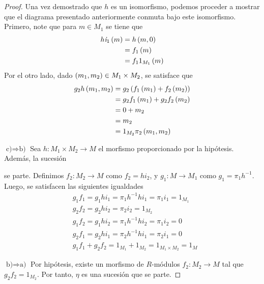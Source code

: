 \documentclass{article}
\begin{document}
\begin{enumerate}[label=\textbf{Ej \arabic*.}]
\begin{proof}
			Una vez demostrado que $h$ es un isomorfismo, podemos proceder a mostrar que el diagrama presentado anteriormente conmuta bajo este isomorfismo. Primero, note que para $m \in M_{1}$ se tiene que 
			\begin{align*}
				h\textit{i}_{1}\left(m\right)&=h\left(m,0\right)\\
				&=f_{1}\left(m\right)\\
				&=f_{1}1_{M_{1}}\left(m\right)
			\end{align*}
			Por el otro lado, dado $\left(m_{1},m_{2}\right) \in M_{1} \times M_{2}$, se satisface que
			\begin{align*}
				g_{2}h\left(m_{1},m_{2}\right)&=g_{2}\left(f_{1}\left(m_{1}\right)+f_{2}\left(m_{2}\right)\right)\\
				&=g_{2}f_{1}\left(m_{1}\right)+g_{2}f_{2}\left(m_{2}\right)\\
				&=0+m_{2}\\
				&=m_{2}\\
				&=1_{M_{2}}\pi_{2}\left(m_{1},m_{2}\right)
			\end{align*}
			
			$\boxed{\text{c)}\Rightarrow\text{b)}}$ Sea $h:M_{1} \times M_{2} \longrightarrow M$ el morfismo proporcionado por la hipótesis. Además, la sucesión
			se parte. Definimos $f_{2}:M_{2} \longrightarrow M$ como $f_{2}=hi_{2}$, y $g_{1}:M \longrightarrow M_{1}$ como $g_{1}=\pi_{1}h^{-1}$.\\
			
			Luego, se satisfacen las siguientes igualdades
			\begin{align*}
				& g_{1}f_{1}=g_{1}hi_{1}=\pi_{1}h^{-1}hi_{1}=\pi_{1}i_{1}=1_{M_{1}}\\
				& g_{2}f_{2}=g_{2}hi_{2}=\pi_{2}i_{2}=1_{M_{2}}\\
				& g_{1}f_{2}=g_{1}hi_{2}=\pi_{1}h^{-1}hi_{2}=\pi_{1}i_{2}=0\\
				& g_{2}f_{1}=g_{2}hi_{1}=\pi_{2}h^{-1}hi_{1}=\pi_{2}i_{1}=0\\
				& g_{1}f_{1}+g_{2}f_{2}=1_{M_{1}}+1_{M_{2}}=1_{M_{1} \times M_{2}}=1_{M}
			\end{align*}
			
			$\boxed{\text{b)}\Rightarrow\text{a)}}$ Por hipótesis, existe un morfismo de $R$-módulos $f_{2}:M_{2} \longrightarrow M$ tal que $g_{2}f_{2}=1_{M_{2}}$. Por tanto, $\eta$ es una sucesión que se parte.
		\end{proof}
		 

\end{enumerate}
\end{document}
